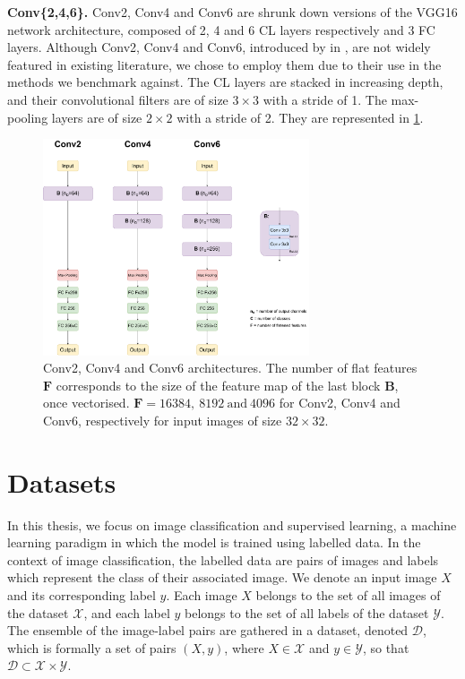 \noindent \textbf{Conv\{2,4,6\}.} Conv2, Conv4 and Conv6 are shrunk down
versions of the VGG16 network architecture, composed of 2, 4 and 6 \ac{CL}
layers respectively and 3 \ac{FC} layers. Although Conv2, Conv4 and Conv6,
introduced by \citeauthor{DBLP:conf/iclr/FrankleC19} in
\cite{DBLP:conf/iclr/FrankleC19}, are not widely featured in existing
literature, we chose to employ them due to their use in the methods we benchmark
against. The \ac{CL} layers are stacked in increasing depth, and their
convolutional filters are of size $3\times 3$ with a stride of 1. The
max-pooling layers are of size $2\times 2$ with a stride of 2. They are
represented in \cref{fig:dlo:conv246}.\\

\begin{figure}[htbp]
  \centering
  \includegraphics[width=0.7\textwidth]{chapter_dlo/assets/conv246.pdf}
  \caption{Conv2, Conv4 and Conv6 architectures. The number of flat features
  $\mathbf{F}$ corresponds to the size of the feature map of the last block
  $\mathbf{B}$, once vectorised. $\mathbf{F}=16384, ~8192~ \text{and}~ 4096$ for Conv2, Conv4
  and Conv6, respectively for input images of size $32\times 32$.}
  \label{fig:dlo:conv246}
\end{figure}


\section{Datasets}\label{sec:dlo:datasets}

In this thesis, we focus on image classification and supervised learning, a
machine learning paradigm in which the model is trained using labelled data. In
the context of image classification, the labelled data are pairs of images and
labels which represent the class of their associated image. We denote an input
image $X$ and its corresponding label $y$. Each image $X$ belongs to the set of
all images of the dataset $\mathcal{X}$, and each label $y$ belongs to the set
of all labels of the dataset $\mathcal{Y}$. The ensemble of the image-label
pairs are gathered in a dataset, denoted $\mathcal{D}$, which is formally a set
of pairs $(X, y)$, where $X \in \mathcal{X}$ and $y \in \mathcal{Y}$, so that
$\mathcal{D} \subset \mathcal{X} \times \mathcal{Y}$. \\

